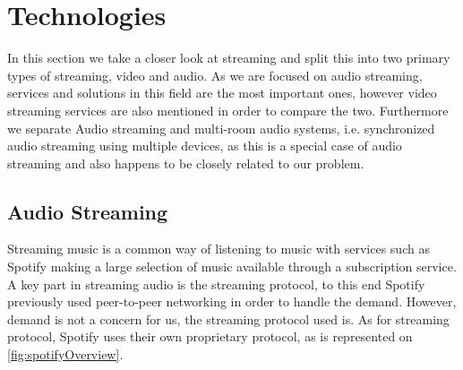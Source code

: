 






\section{Technologies}
In this section we take a closer look at streaming and split this into two primary types of streaming, video and audio.
As we are focused on audio streaming, services and solutions in this field are the most important ones, however video streaming services are also mentioned in order to compare the two.
Furthermore we separate Audio streaming and multi-room audio systems, i.e. synchronized audio streaming using multiple devices, as this is a special case of audio streaming and also happens to be closely related to our problem.

\subsection{Audio Streaming}
Streaming music is a common way of listening to music with services such as Spotify making a large selection of music available through a subscription service.
A key part in streaming audio is the streaming protocol, to this end Spotify previously used peer-to-peer networking in order to handle the demand.\cite{spotify1}
However, demand is not a concern for us, the streaming protocol used is.
As for streaming protocol, Spotify uses their own proprietary protocol, as is represented on \cref{fig:spotifyOverview}.\cite{spotifySlides} %

